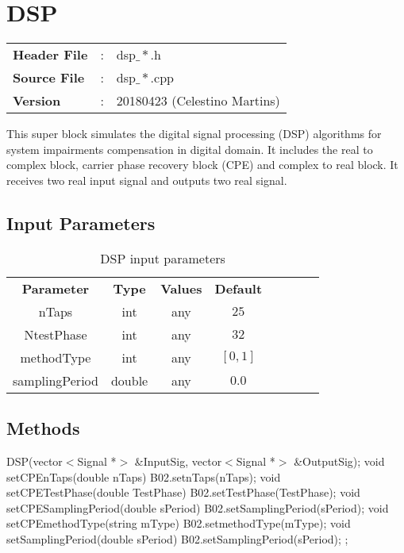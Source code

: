 \clearpage

\section{DSP}

\begin{tcolorbox}	
	\begin{tabular}{p{2.75cm} p{0.2cm} p{10.5cm}} 	
		\textbf{Header File}   &:& dsp$\_*$.h \\
		\textbf{Source File}   &:& dsp$\_*$.cpp \\
        \textbf{Version}       &:& 20180423 (Celestino Martins) \\
	\end{tabular}
\end{tcolorbox}

This super block simulates the digital signal processing (DSP) algorithms for system impairments compensation in digital domain. It includes the real to complex block, carrier phase recovery block (CPE) and complex to real block. It receives two real input signal and outputs two real signal.

\subsection*{Input Parameters}

\begin{table}[h]
	\centering
	\begin{tabular}{|c|c|c|c|cccc}
		\cline{1-4}
		\textbf{Parameter} & \textbf{Type} & \textbf{Values} &   \textbf{Default}& \\ \cline{1-4}
		nTaps              & int & any & $25$ \\ \cline{1-4}
        NtestPhase         & int & any & $32$ \\ \cline{1-4}
        methodType         & int & any & $[0,1]$ \\ \cline{1-4}
		samplingPeriod     & double & any & $0.0$ \\ \cline{1-4}	
	\end{tabular}
	\caption{DSP input parameters}
	\label{table:dsp_in_par}
\end{table}

\subsection*{Methods}

DSP(vector$<$Signal *$>$ \&InputSig, vector$<$Signal *$>$ \&OutputSig);
\bigbreak
void setCPEnTaps(double nTaps) { B02.setnTaps(nTaps); }
\bigbreak
void setCPETestPhase(double TestPhase) { B02.setTestPhase(TestPhase); }
\bigbreak
void setCPESamplingPeriod(double sPeriod) { B02.setSamplingPeriod(sPeriod); }
\bigbreak
void setCPEmethodType(string mType) { B02.setmethodType(mType); }
\bigbreak
void setSamplingPeriod(double sPeriod) { B02.setSamplingPeriod(sPeriod); };


